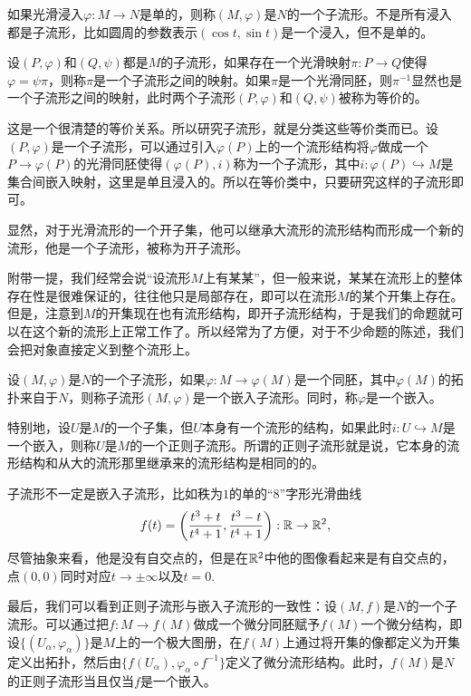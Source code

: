 \begin{para}[子流形]
如果光滑浸入$\varphi:M\to N$是单的，则称$(M,\varphi)$是$N$的一个子流形。不是所有浸入都是子流形，比如圆周的参数表示$(\cos t,\sin t)$是一个浸入，但不是单的。

设$(P,\varphi)$和$(Q,\psi)$都是$M$的子流形，如果存在一个光滑映射$\pi:P\to Q$使得$\varphi=\psi\pi$，则称$\pi$是一个子流形之间的映射。如果$\pi$是一个光滑同胚，则$\pi^{-1}$显然也是一个子流形之间的映射，此时两个子流形$(P,\varphi)$和$(Q,\psi)$被称为等价的。
\end{para}

这是一个很清楚的等价关系。所以研究子流形，就是分类这些等价类而已。设$(P,\varphi)$是一个子流形，可以通过引入$\varphi(P)$上的一个流形结构将$\varphi$做成一个$P\to \varphi(P)$的光滑同胚使得$(\varphi(P),i)$称为一个子流形，其中$i:\varphi(P)\hookrightarrow M$是集合间嵌入映射，这里是单且浸入的。所以在等价类中，只要研究这样的子流形即可。

显然，对于光滑流形的一个开子集，他可以继承大流形的流形结构而形成一个新的流形，他是一个子流形，被称为开子流形。

附带一提，我们经常会说“设流形$M$上有某某”，但一般来说，某某在流形上的整体存在性是很难保证的，往往他只是局部存在，即可以在流形$M$的某个开集上存在。但是，注意到$M$的开集现在也有流形结构，即开子流形结构，于是我们的命题就可以在这个新的流形上正常工作了。所以经常为了方便，对于不少命题的陈述，我们会把对象直接定义到整个流形上。

\begin{para}[嵌入与正则子流形]
设$(M,\varphi)$是$N$的一个子流形，如果$\varphi:M\to \varphi(M)$是一个同胚，其中$\varphi(M)$的拓扑来自于$N$，则称子流形$(M,\varphi)$是一个嵌入子流形。同时，称$\varphi$是一个嵌入。

特别地，设$U$是$M$的一个子集，但$U$本身有一个流形的结构，如果此时$i:U\hookrightarrow M$是一个嵌入，则称$U$是$M$的一个正则子流形。所谓的正则子流形就是说，它本身的流形结构和从大的流形那里继承来的流形结构是相同的的。
\end{para}

子流形不一定是嵌入子流形，比如秩为$1$的单的“8”字形光滑曲线
\[
	f(t)=\left(\frac{t^3+t}{t^4+1},\frac{t^3-t}{t^4+1}\right):\mathbb{R} \to \mathbb{R}^2,
\]
尽管抽象来看，他是没有自交点的，但是在$\mathbb{R}^2$中他的图像看起来是有自交点的，点$(0,0)$同时对应$t\to \pm\infty$以及$t=0$. 

最后，我们可以看到正则子流形与嵌入子流形的一致性：设$(M,f)$是$N$的一个子流形。可以通过把$f:M\to f(M)$做成一个微分同胚赋予$f(M)$一个微分结构，即设$\{(U_\alpha,\varphi_\alpha)\}$是$M$上的一个极大图册，在$f(M)$上通过将开集的像都定义为开集定义出拓扑，然后由$\{f(U_\alpha),\varphi_\alpha\circ f^{-1}\}$定义了微分流形结构。此时，$f(M)$是$N$的正则子流形当且仅当$f$是一个嵌入。

